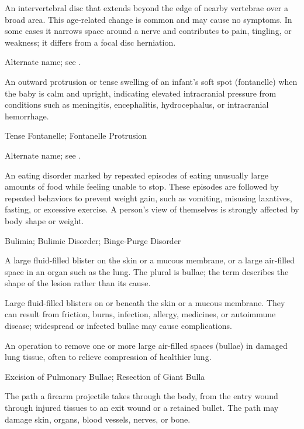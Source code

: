  An intervertebral disc that extends beyond the
  edge of nearby vertebrae over a broad area. This age-related change is
  common and may cause no symptoms. In some cases it narrows space
  around a nerve and contributes to pain, tingling, or weakness; it
  differs from a focal disc herniation.

 Alternate name; see .

 An outward protrusion or tense swelling of an infant's soft spot (fontanelle) when the baby is calm and upright, indicating elevated intracranial pressure from conditions such as meningitis, encephalitis, hydrocephalus, or intracranial hemorrhage.

\synonyms
Tense Fontanelle; Fontanelle Protrusion

 Alternate name; see .

 An eating disorder marked by repeated episodes of eating unusually large amounts of food while feeling unable to stop. These episodes are followed by repeated behaviors to prevent weight gain, such as vomiting, misusing laxatives, fasting, or excessive exercise. A person's view of themselves is strongly affected by body shape or weight.


\synonyms
Bulimia; Bulimic Disorder; Binge-Purge Disorder

 A large fluid-filled blister on the skin or a mucous membrane,
or a large air-filled space in an organ such as the lung. The plural is bullae;
the term describes the shape of the lesion rather than its cause.

 Large fluid-filled blisters on or beneath the skin or a mucous membrane. They can result from friction, burns, infection, allergy, medicines, or autoimmune disease; widespread or infected bullae may cause complications.

 An operation to remove one or more large air-filled spaces (bullae) in damaged lung tissue, often to relieve compression of healthier lung.

\synonyms
Excision of Pulmonary Bullae; Resection of Giant Bulla

 The path a firearm projectile takes through the body, from the entry wound through injured tissues to an exit wound or a retained bullet. The path may damage skin, organs, blood vessels, nerves, or bone.

